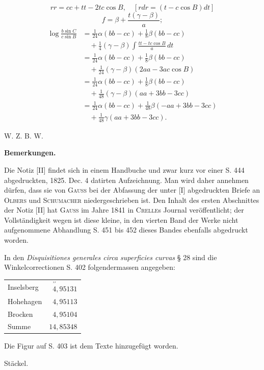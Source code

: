 %
\[
rr=cc+tt-2tc\cos B,\quad[rdr=(t-c\cos B)dt]
\]
\noindent [und]
\[
f=\beta+\frac{t(\gamma-\beta)}a;
\]
\[
\begin{aligned}
\log\frac{b\sin C}{c\sin B}&=\tfrac1{24}\alpha(bb-cc)+\tfrac18\beta(bb-cc)\\
&\quad+\tfrac14(\gamma-\beta)\int\frac{tt-tc\cos B}a\,dt\\
&=\tfrac1{24}\alpha(bb-cc)+\tfrac18\beta(bb-cc)\\
&\quad+\tfrac1{24}(\gamma-\beta)(2aa-3ac\cos B)\\
&=\tfrac1{24}\alpha(bb-cc)+\tfrac18\beta(bb-cc)\\
&\quad+\tfrac1{48}(\gamma-\beta)(aa+3bb-3cc)\\
&=\tfrac1{24}\alpha(bb-cc)+\tfrac1{48}\beta(-aa+3bb-3cc)\\
&\quad+\tfrac1{48}\gamma(aa+3bb-3cc).
\end{aligned}
\]
\begin{flushright}W. Z. B. W.\end{flushright}
\par{}\begin{center}\textbf{Bemerkungen.}\end{center}
\noindent\hspace*{1.2em}Die Notiz [II] findet sich in einem Handbuche und zwar kurz vor einer S. 444 abgedruckten, 1825. Dec. 4 datirten Aufzeichnung. Man wird daher annehmen dürfen, dass sie von \textsc{Gauss} bei der Abfassung der unter [I] abgedruckten Briefe an \textsc{Olbers} und \textsc{Schumacher} niedergeschrieben ist. Den Inhalt des ersten Abschnittes der Notiz [II] hat \textsc{Gauss} im Jahre 1841 in \textsc{Crelle}s Journal veröffentlicht; der Vollständigkeit wegen ist diese kleine, in den vierten Band der Werke nicht aufgenommene Abhandlung S. 451 bis 452 dieses Bandes ebenfalls abgedruckt worden.

In den \textit{Disquisitiones generales circa superficies curvas} § 28 sind die Winkelcorrectionen S. 402 folgendermassen angegeben:
\begin{center}\begin{tabular}{lr}
Inselsberg & $\overset{\prime\prime}{4}{,}95131$\\
Hohehagen & $4{,}95113$\\
Brocken & $4{,}95104$\\
Summe & $14{,}85348$
\end{tabular}\end{center}
\noindent\hspace*{1.2em}Die Figur auf S. 403 ist dem Texte hinzugefügt worden.
\begin{flushright}Stäckel.\end{flushright}
